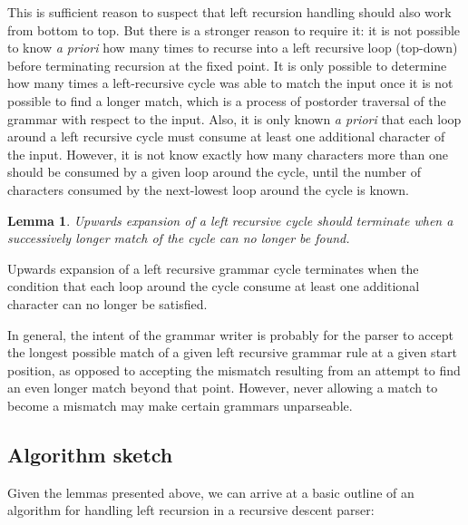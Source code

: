 \documentclass[manuscript]{acmart}
\newtheorem{lemma}[theorem]{Lemma}
\begin{document}
This is sufficient reason to suspect that left recursion handling should also work from bottom to top. But there is a stronger reason to require it: it is not possible to know \emph{a priori} how many times to recurse into a left recursive loop (top-down) before terminating recursion at the fixed point. It is only possible to determine how many times a left-recursive cycle was able to match the input once it is not possible to find a longer match, which is a process of postorder traversal of the grammar with respect to the input. Also, it is only known \emph{a priori} that each loop around a left recursive cycle must consume at least one additional character of the input. However, it is not know exactly how many characters more than one should be consumed by a given loop around the cycle, until the number of characters consumed by the next-lowest loop around the cycle is known.

\begin{lemma}
Upwards expansion of a left recursive cycle should terminate when a successively longer match of the cycle can no longer be found.
\end{lemma}

Upwards expansion of a left recursive grammar cycle terminates when the condition that each loop around the cycle consume at least one additional character can no longer be satisfied.

In general, the intent of the grammar writer is probably for the parser to accept the longest possible match of a given left recursive grammar rule at a given start position, as opposed to accepting the mismatch resulting from an attempt to find an even longer match beyond that point. However, never allowing a match to become a mismatch may make certain grammars unparseable. %


\subsection{Algorithm sketch}

Given the lemmas presented above, we can arrive at a basic outline of an algorithm for handling left recursion in a recursive descent parser:
\end{document}
